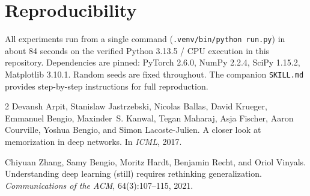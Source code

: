 \documentclass[11pt,a4paper]{article}
\begin{document}
\section{Reproducibility}

All experiments run from a single command (\texttt{.venv/bin/python run.py}) in about 84 seconds on the verified Python 3.13.5 / CPU execution in this repository.
Dependencies are pinned: PyTorch 2.6.0, NumPy 2.2.4, SciPy 1.15.2, Matplotlib 3.10.1.
Random seeds are fixed throughout.
The companion \texttt{SKILL.md} provides step-by-step instructions for full reproduction.


\begin{thebibliography}{2}
Devansh Arpit, Stanislaw Jastrzebski, Nicolas Ballas, David Krueger, Emmanuel Bengio, Maxinder~S. Kanwal, Tegan Maharaj, Asja Fischer, Aaron Courville, Yoshua Bengio, and Simon Lacoste-Julien.
\newblock A closer look at memorization in deep networks.
\newblock In \emph{ICML}, 2017.

Chiyuan Zhang, Samy Bengio, Moritz Hardt, Benjamin Recht, and Oriol Vinyals.
\newblock Understanding deep learning (still) requires rethinking generalization.
\newblock \emph{Communications of the ACM}, 64(3):107--115, 2021.
\end{thebibliography}
\end{document}
